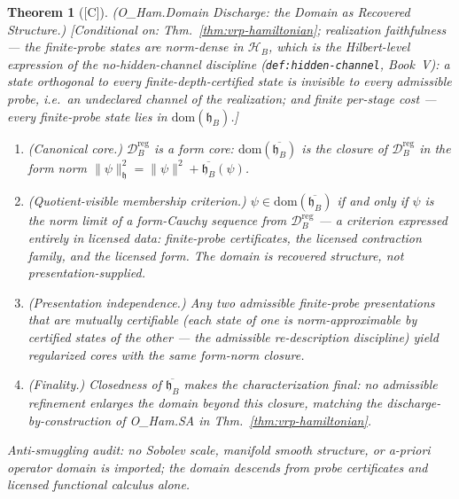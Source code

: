 \documentclass[12pt,oneside]{amsbook}
\theoremstyle{plain}
\newtheorem{theorem}{Theorem}[section]
\theoremstyle{definition}
\theoremstyle{remark}
\newcommand{\status}[1]{\textup{[#1]}}
\begin{document}
\begin{theorem}[\status{C}]\label{thm:vrp-ham-domain}
\textup{(O\_Ham.Domain Discharge: the Domain as Recovered
Structure.)}
\textup{[Conditional on: Thm.~\ref{thm:vrp-hamiltonian};
\emph{realization faithfulness} --- the finite-probe states are
norm-dense in $\mathcal{H}_B$, which is the Hilbert-level
expression of the no-hidden-channel discipline
(\texttt{def:hidden-channel}, Book~V): a state orthogonal to
every finite-depth-certified state is invisible to every
admissible probe, i.e.\ an undeclared channel of the realization;
and \emph{finite per-stage cost} --- every finite-probe state lies
in $\mathrm{dom}(\mathfrak{h}_B)$.]}
\begin{enumerate}[label=\textup{(\arabic*)}]
  \item \emph{(Canonical core.)}
    $\mathcal{D}_B^{\mathrm{reg}}$ is a form core:
    $\mathrm{dom}(\overline{\mathfrak{h}_B})$ is the closure of
    $\mathcal{D}_B^{\mathrm{reg}}$ in the form norm
    $\|\psi\|_{\mathfrak{h}}^2 = \|\psi\|^2 +
    \overline{\mathfrak{h}_B}(\psi)$.
  \item \emph{(Quotient-visible membership criterion.)}
    $\psi \in \mathrm{dom}(\overline{\mathfrak{h}_B})$ if and only
    if $\psi$ is the norm limit of a form-Cauchy sequence from
    $\mathcal{D}_B^{\mathrm{reg}}$ --- a criterion expressed
    entirely in licensed data: finite-probe certificates, the
    licensed contraction family, and the licensed form.  The
    domain is recovered structure, not presentation-supplied.
  \item \emph{(Presentation independence.)}  Any two admissible
    finite-probe presentations that are mutually certifiable
    (each state of one is norm-approximable by certified states
    of the other --- the admissible re-description discipline)
    yield regularized cores with the same form-norm closure.
  \item \emph{(Finality.)}  Closedness of
    $\overline{\mathfrak{h}_B}$ makes the characterization final:
    no admissible refinement enlarges the domain beyond this
    closure, matching the discharge-by-construction of O\_Ham.SA
    in Thm.~\ref{thm:vrp-hamiltonian}.
\end{enumerate}
Anti-smuggling audit: no Sobolev scale, manifold smooth
structure, or a-priori operator domain is imported; the domain
descends from probe certificates and licensed functional calculus
alone.
\end{theorem}
\end{document}
